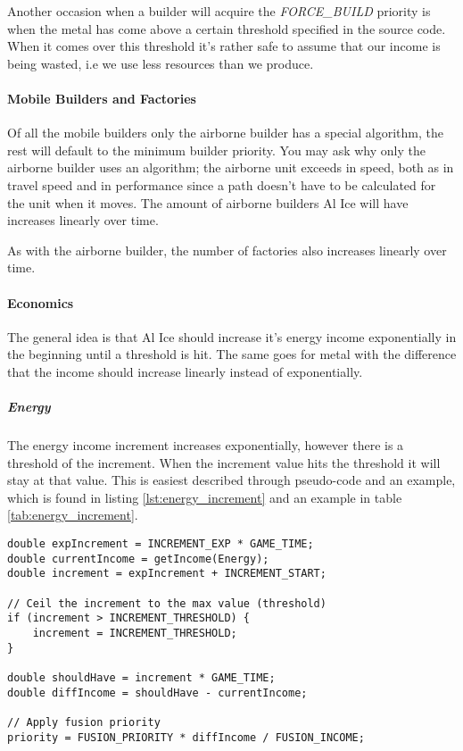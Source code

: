 Another occasion when a builder will acquire the \emph{FORCE\_BUILD} priority is
when the metal has come above a certain threshold specified in the source code. When it comes over
this threshold it's rather safe to assume that our income is being wasted, i.e we use less
resources than we produce.

\paragraph{Mobile Builders and Factories}
Of all the mobile builders only the airborne builder has a special algorithm, the rest will
default to the minimum builder priority. You may ask why only the airborne builder uses an
algorithm; the airborne unit exceeds in speed, both as in travel speed and in performance since a
path doesn't have to be calculated for the unit when it moves. The amount of airborne builders Al
Ice will have increases linearly over time.

As with the airborne builder, the number of
factories also increases linearly over time.

\paragraph{Economics}
The general idea is that Al Ice should increase it's energy income exponentially in the beginning
until a threshold is hit. The same goes for metal with the difference that the income should
increase linearly instead of exponentially.

\subparagraph{Energy}
The energy income increment increases exponentially, however there is a threshold of the increment.
When the increment value hits the threshold it will stay at that value. This is easiest described
through pseudo-code and an example, which is found in listing
\ref{lst:energy_increment} and an example in table \ref{tab:energy_increment}.
\begin{lstfloat}
\begin{lstlisting}[caption={Energy Increment Over Time},label={lst:energy_increment}]
double expIncrement = INCREMENT_EXP * GAME_TIME;
double currentIncome = getIncome(Energy);
double increment = expIncrement + INCREMENT_START;

// Ceil the increment to the max value (threshold)
if (increment > INCREMENT_THRESHOLD) {
	increment = INCREMENT_THRESHOLD;
}

double shouldHave = increment * GAME_TIME;
double diffIncome = shouldHave - currentIncome;

// Apply fusion priority
priority = FUSION_PRIORITY * diffIncome / FUSION_INCOME; 
\end{lstlisting}
\end{lstfloat}

